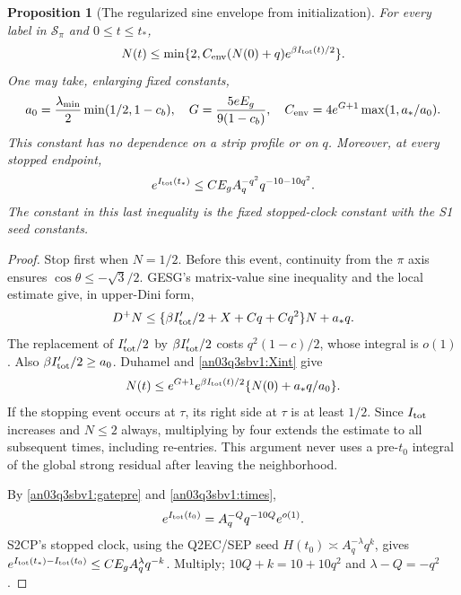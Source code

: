 \documentclass[11pt]{article}
\numberwithin{equation}{section}
\newtheorem{proposition}{Proposition}[section]
\theoremstyle{remark}\newtheorem{remark}[proposition]{Remark}
\newcommand{\Sm}{\mathcal S}
\begin{document}
\begin{proposition}[The regularized sine envelope from initialization]
\label{an03q3sbv1:envelope}
For every label in $\Sm_\pi$ and $0\le t\le t_*$,
\begin{equation}
 N(t)\le \min\{2,C_{\rm env}(N(0)+q)
                         e^{\beta I_{\rm tot}(t)/2}\}.
 \label{an03q3sbv1:Nenv}
\end{equation}
One may take, enlarging fixed constants,
\[
 a_0=\frac{\lambda_{\min}}2\min(1/2,1-c_b),\quad
 G=\frac{5eE_g}{9(1-c_b)},\quad
 C_{\rm env}=4e^{G+1}\max(1,a_*/a_0).
\]
This constant has no dependence on a strip profile or on $q$.
Moreover, at every stopped endpoint,
\begin{equation}
 e^{I_{\rm tot}(t_*)}
   \le C E_g A_q^{-q^2}q^{-10-10q^2}.
 \label{an03q3sbv1:totalclock}
\end{equation}
The constant in this last inequality is the fixed stopped-clock
constant with the S1 seed constants.
\end{proposition}
\begin{proof}
Stop first when $N=1/2$. Before this event, continuity from the
$\pi$ axis ensures $\cos\theta\le-\sqrt3/2$. GESG's matrix-value
sine inequality and the local estimate give, in upper-Dini form,
\[
 D^+N\le\{\beta I_{\rm tot}'/2+X+Cq+Cq^2\}N+a_*q.
\]
The replacement of $I_{\rm tot}'/2$ by $\beta I_{\rm tot}'/2$
costs $q^2(1-c)/2$, whose integral is $o(1)$. Also
$\beta I_{\rm tot}'/2\ge a_0$.
Duhamel and \eqref{an03q3sbv1:Xint} give
\[
 N(t)\le e^{G+1}e^{\beta I_{\rm tot}(t)/2}
                         \{N(0)+a_*q/a_0\}.
\]
If the stopping event occurs at $\tau$, its right side at $\tau$
is at least $1/2$. Since $I_{\rm tot}$ increases and $N\le2$
always, multiplying by four extends the estimate to all subsequent
times, including re-entries. This argument never uses a pre-$t_0$
integral of the global strong residual after leaving the neighborhood.

By \eqref{an03q3sbv1:gatepre} and \eqref{an03q3sbv1:times},
\[
 e^{I_{\rm tot}(t_0)}
      =A_q^{-Q}q^{-10Q}e^{o(1)}.
\]
S2CP's stopped clock, using the Q2EC/SEP seed
$H(t_0)\asymp A_q^{-\lambda}q^k$, gives
$e^{I_{\rm tot}(t_*)-I_{\rm tot}(t_0)}
 \le C E_g A_q^\lambda q^{-k}$.
Multiply; $10Q+k=10+10q^2$ and $\lambda-Q=-q^2$.
\end{proof}
\end{document}
